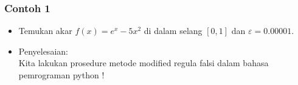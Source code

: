 \documentclass[pdflatex,compress]{beamer}
\begin{document}
\begin{frame}
	\frametitle{Contoh 1}
	\begin{itemize}
		\item Temukan akar $ f(x) = e^x - 5x^2 $ di dalam selang $ [0, 1] $ dan $ \varepsilon = 0.00001 $.
		\item Penyelesaian:\\Kita lakukan prosedure metode modified regula falsi dalam bahasa pemrograman python !
	\end{itemize}
\end{frame}
\end{document}
